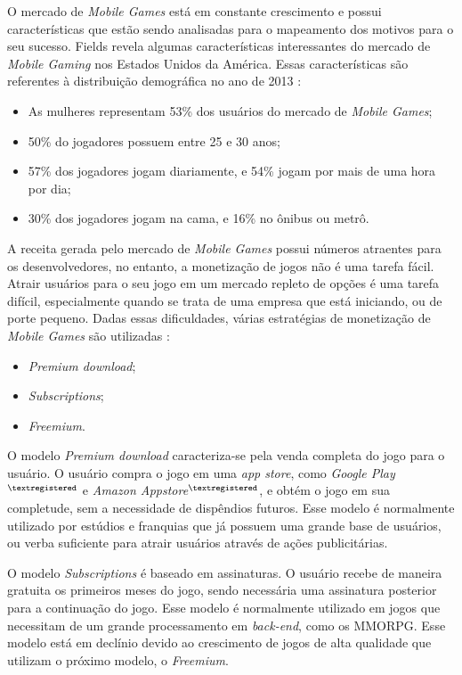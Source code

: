 O mercado de \textit{Mobile Games} está em constante crescimento e possui
características que estão sendo analisadas para o mapeamento dos motivos para
o seu sucesso. Fields \cite{fields2014} revela algumas características
interessantes do mercado de \textit{Mobile Gaming} nos Estados Unidos da
América. Essas características são referentes à distribuição demográfica no
ano de 2013 \cite{fields2014}:

\begin{itemize}
  \item As mulheres representam 53\% dos usuários do mercado de \textit{Mobile Games};
  \item 50\% do jogadores possuem entre 25 e 30 anos;
  \item 57\% dos jogadores jogam diariamente, e 54\% jogam por mais de uma hora por dia;
  \item 30\% dos jogadores jogam na cama, e 16\% no ônibus ou metrô.
\end{itemize}

A receita gerada pelo mercado de \textit{Mobile Games} possui números
atraentes para os desenvolvedores, no entanto, a monetização de jogos não é
uma tarefa fácil. Atrair usuários para o seu jogo em um mercado repleto de
opções é uma tarefa difícil, especialmente quando se trata de uma empresa que
está iniciando, ou de porte pequeno. Dadas essas dificuldades, várias
estratégias de monetização de \textit{Mobile Games} são utilizadas
\cite{fields2014}:

\begin{itemize}
  \item \textit{Premium download};
  \item \textit{Subscriptions};
  \item \textit{Freemium}.
\end{itemize}

O modelo \textit{Premium download} caracteriza-se pela venda completa do jogo
para o usuário. O usuário compra o jogo em uma \textit{app store}, como
\textit{Google Play}$^{\tiny{®}}$ e \textit{Amazon Appstore}$^{\tiny{®}}$, e
obtém o jogo em sua completude, sem a necessidade de dispêndios futuros. Esse
modelo é normalmente utilizado por estúdios e franquias que já possuem uma
grande base de usuários, ou verba suficiente para atrair usuários através de
ações publicitárias.

O modelo \textit{Subscriptions} é baseado em assinaturas. O usuário recebe de
maneira gratuita os primeiros meses do jogo, sendo necessária uma assinatura
posterior para a continuação do jogo. Esse modelo é normalmente utilizado em
jogos que necessitam de um grande processamento em \textit{back-end}, como os
MMORPG. Esse modelo está em declínio devido ao crescimento de jogos de alta
qualidade que utilizam o próximo modelo, o \textit{Freemium}.

